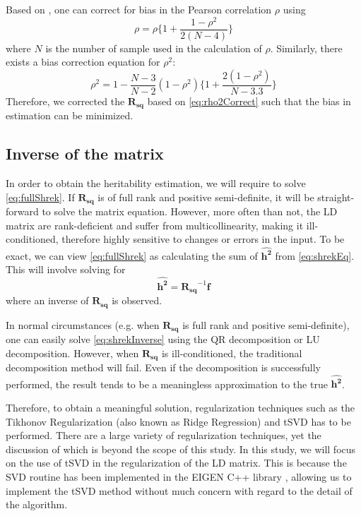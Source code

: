 			Based on \citet{Shieh2010}, one can correct for bias in the Pearson correlation $\rho$ using
			\begin{equation}
			\rho = \rho\{1+\frac{1-\rho^2}{2(N-4)}\}
			\label{eq:rhoCorrect}
			\end{equation}
			where $N$ is the number of sample used in the calculation of $\rho$. 
			Similarly, there exists a bias correction equation for $\rho^2$:
			\begin{equation}
				\rho^2=1-\frac{N-3}{N-2}(1-\rho^2)\{1+\frac{2(1-\rho^2)}{N-3.3}\}
				\label{eq:rho2Correct}
			\end{equation}
			Therefore, we corrected the $\boldsymbol{R_{sq}}$ based on \cref{eq:rho2Correct} such that the bias in estimation can be minimized. 
		\subsection{Inverse of the  matrix}
			In order to obtain the heritability estimation, we will require to solve \cref{eq:fullShrek}. 
			If $\boldsymbol{R_{sq}}$ is of full rank and positive semi-definite, it will be straight-forward to solve the matrix equation.
			However, more often than not, the \gls{LD} matrix are rank-deficient and suffer from multicollinearity, making it ill-conditioned, therefore highly sensitive to changes or errors in the input.
			To be exact, we can view \cref{eq:fullShrek} as calculating the sum of $\boldsymbol{\hat{h^2}}$ from  \cref{eq:shrekEq}.
			This will involve solving for
			\begin{equation}
			\boldsymbol{\hat{h^2}} = \boldsymbol{R_{sq}}^{-1}\boldsymbol{f}
			\label{eq:shrekInverse}
			\end{equation}
			where an inverse of $\boldsymbol{R_{sq}}$ is observed. 
			
			In normal circumstances (e.g. when $\boldsymbol{R_{sq}}$ is full rank and positive semi-definite), one can easily solve \cref{eq:shrekInverse} using the QR decomposition or LU decomposition.
			However, when $\boldsymbol{R_{sq}}$ is ill-conditioned, the traditional decomposition method will fail.
			Even if the decomposition is successfully performed, the result tends to be a meaningless approximation to the true $\boldsymbol{\hat{h^2}}$. 
			
			Therefore, to obtain a meaningful solution, regularization techniques such as the Tikhonov Regularization (also known as Ridge Regression) and \gls{tSVD} has to be performed\citep{Neumaier1998}. 
			There are a large variety of regularization techniques, yet the discussion of which is beyond the scope of this study. 
			In this study, we will focus on the use of \gls{tSVD} in the regularization of the \gls{LD} matrix.
			This is because the \gls{SVD} routine has been implemented in the EIGEN C++ library \citep{eigenweb}, allowing us to implement the \gls{tSVD} method without much concern with regard to the detail of the algorithm. 
			
